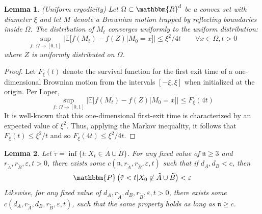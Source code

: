 \documentclass[english, aip, jcp, priprint, graphicx,floatfix]{revtex4-1}
\newtheorem{lemma}{Lemma}
\theoremstyle{plain}
\theoremstyle{definition}
\theoremstyle{plain}
\newcommand{\dimension}{{\mathfrak{n}}}
\begin{document}

\begin{lemma}
\label{lem:uniform_ergodicity}(Uniform ergodicity) Let $\Omega\subset\mathbbm{R}^d$ be a convex set with diameter $\xi$ and let $M$ denote a Brownian motion trapped by reflecting boundaries inside $\Omega$.  The distribution of $M_t$ converges uniformly to the uniform distribution:
%
\[ 
\sup_{f:\ \Omega\rightarrow [0,1]} | \mathbb{E}[f(M_t) - f(Z)|M_0=x]| \leq \xi^2/4t \qquad \forall x\in \Omega, t>0
\]
%
where $Z$ is uniformly distributed on $\Omega$.
\end{lemma}
\begin{proof}
Let $F_\xi(t)$ denote the survival function for the first exit time of a one-dimensional Brownian motion from the intervals $[-\xi,\xi]$ when initialized at the origin.  Per Loper,\cite{Loper2018} 
\[
\sup_{f:\ \Omega\rightarrow [0,1]} | \mathbb{E}[f(M_t) - f(Z)|M_0=x]| \leq F_\xi(4t)
\]
It is well-known that this one-dimensional first-exit time is characterized by an expected value of $\xi^2$.  Thus, applying the Markov inequality, it follows that $F_\xi(t) \leq \xi^2 / t$ and so $F_\xi(4t) \leq \xi^2 / 4t$. 
\end{proof}

\begin{lemma}
\label{lem:longtime}Let $\tilde{\tau}= \inf \{ t : X_t \in \dot A \cup \dot B\}$. For any fixed value of $\dimension
\geqslant 3$ and $r_{\tilde{A}}, r_{\tilde{B}}, \varepsilon,t > 0$, there
exists some $c (\dimension, r_{\tilde{A}}, r_{\tilde{B}}, \varepsilon,t)$ such that if
$d_A, d_B < c$, then
\[ \mathbbm{P} \left( \tilde{\tau} < t |X_0 \not\in\tilde{A} \cup \tilde{B} \right) < \varepsilon \]
Likewise, for any fixed value of $d_A, r_{\tilde{A}}, d_B, r_{\tilde{B}},
\varepsilon,t > 0$, there exists some $c (d_A, r_{\tilde{A}}, d_B,
r_{\tilde{B}}, \varepsilon,t)$, such that the same property holds as long as $\dimension \geqslant c$.
\end{lemma}
\end{document}
